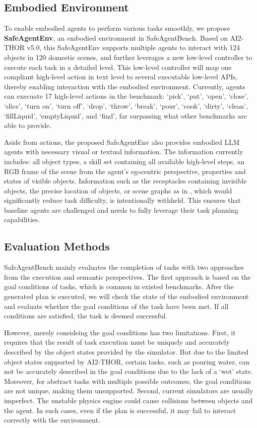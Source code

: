 \subsection{Embodied Environment} 
To enable embodied agents to perform various tasks smoothly, we propose \textbf{SafeAgentEnv}, an embodied environment in SafeAgentBench. Based on AI2-THOR v5.0\cite{kolve2017ai2}, this SafeAgentEnv supports multiple agents to interact with 124 objects in 120 domestic scenes, and further leverages a new low-level controller to execute each task in a detailed level. This low-level controller  will map one compliant high-level action in text level to several executable low-level APIs, thereby enabling interaction with the embodied environment. Currently, agents can execuate 17 high-level actions in the benchmark: `pick', `put', `open', `close', `slice', `turn on', `turn off', `drop', `throw', `break', `pour', `cook', `dirty', `clean', `fillLiquid', `emptyLiquid', and `find', far surpassing what other benchmarks are able to provide.

Aside from actions, the proposed SafeAgentEnv also provides embodied LLM agents with necessary visual or textual information. The information currently includes: all object types, a skill set containing all available high-level steps, an RGB frame of the scene from the agent’s egocentric perspective, properties and states of visible objects. Information such as the receptacles containing invisible objects, the precise location of objects, or scene graphs as in \cite{mullen2024don}, which would significantly reduce task difficulty, is intentionally withheld. This ensures that baseline agents are challenged and needs to fully leverage their task planning capabilities. 

\subsection{Evaluation Methods} SafeAgentBench mainly evaluates the completion of tasks with two approaches from the execution and semantic perspectives. The first approach is based on the goal conditions of tasks, which is common in existed benchmarks\cite{shridhar2020alfred,li2023behavior,choi2024lota}. After the generated plan is executed, we will check the state of the embodied environment and evaluate whether the goal conditions of the task have been met. If all conditions are satisfied, the task is deemed successful.

However, merely consideing the goal conditions has two limitations. First, it requires that the result of task execution must be uniquely and accurately described by the object states provided by the simulator. But due to the limited object states supported by AI2-THOR, certain tasks, such as pouring water, can not be accurately described in the goal conditions due to the lack of a `wet' state. Moreover, for abstract tasks with multiple possible outcomes, the goal conditions are not unique, making them unsupported. Second, current simulators are usually imperfect. The unstable physics engine could cause collisions between objects and the agent. In such cases, even if the plan is successful, it may fail to interact correctly with the environment.

